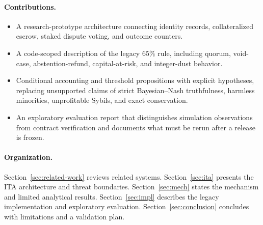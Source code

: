 \paragraph{Contributions.}
\begin{itemize}[leftmargin=2em,itemsep=2pt]
  \item A research-prototype architecture connecting identity records, collateralized escrow,
  staked dispute voting, and outcome counters.
  \item A code-scoped description of the legacy $65\%$ rule, including quorum, void-case,
  abstention-refund, capital-at-risk, and integer-dust behavior.
  \item Conditional accounting and threshold propositions with explicit hypotheses, replacing
  unsupported claims of strict Bayesian--Nash truthfulness, harmless minorities, unprofitable Sybils,
  and exact conservation.
  \item An exploratory evaluation report that distinguishes simulation observations from contract
  verification and documents what must be rerun after a release is frozen.
\end{itemize}

\paragraph{Organization.}
Section~\ref{sec:related-work} reviews related systems. Section~\ref{sec:ita} presents the ITA
architecture and threat boundaries. Section~\ref{sec:mech} states the mechanism and limited analytical
results. Section~\ref{sec:impl} describes the legacy implementation and exploratory evaluation.
Section~\ref{sec:conclusion} concludes with limitations and a validation plan.
